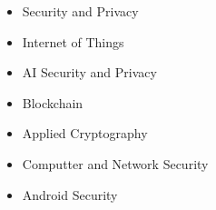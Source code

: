 \begin{cvparagraph}
    \begin{itemize}
			\item {Security and Privacy} 
			\item {Internet of Things} 
			\item {AI Security and Privacy}
			\item {Blockchain}
			\item {Applied Cryptography}
			\item {Computter and Network Security}
			\item {Android Security}
    \end{itemize}
\end{cvparagraph}